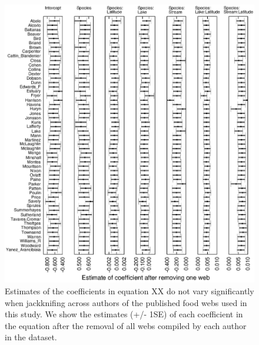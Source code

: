 \documentclass[12pt]{article}
\begin{document}
    \begin{figure}[h]
    \centerline{\includegraphics*[width=.8\textwidth]{Figures/Jackknife/Gen_author.eps}}
    \caption{Estimates of the coefficients in equation XX do not vary significantly
    when jackknifing across authors of the published food webs used in this study. 
    We show the estimates (+/- 1SE) of each coefficient
    in the equation after the removal of all webs compiled by each author in the dataset.}
    \label{Gen_web}
    \end{figure}
\end{document}
